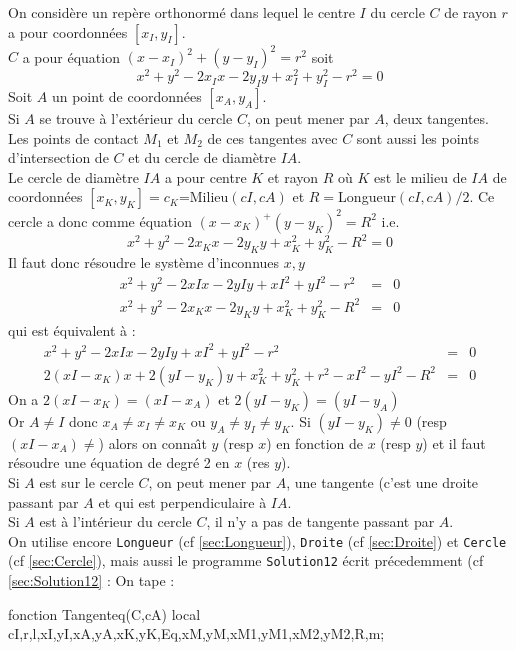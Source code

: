 \documentclass[12pt,a4paper]{book}
\begin{document}
\begin{giacjshere}
On consid\`ere un rep\`ere orthonorm\'e dans lequel le centre $I$ du cercle 
$C$ de rayon $r$ a pour  coordonn\'ees $[x_I,y_I]$.\\
$ C$ a pour \'equation $(x-x_I)^2+(y-y_I)^2=r^2$ soit
$$x^2+y^2-2x_Ix-2y_Iy+x_I^2+y_I^2-r^2=0$$
Soit $ A$ un point de coordonn\'ees $ [x_A,y_A]$.\\
Si $ A$ se trouve \`a l'ext\'erieur du cercle $ C$, on peut mener par 
$ A$, deux tangentes. Les points de contact $ M_1$ et $ M_2$ de ces 
tangentes  avec $ C$ sont aussi les points d'intersection de $ C$ et du 
cercle de diam\`etre $ IA$.\\ 
Le cercle de diam\`etre $ IA$ a pour centre $ K$ et rayon $R$
o\`u $K$ est le milieu de $ IA$
de coordonn\'ees $ [x_K,y_K]=c_K$=Milieu$(cI,cA)$ et
$ R=$Longueur$(cI,cA)/2$.
Ce cercle a donc comme \'equation $(x-x_K)^+(y-y_K)^2=R^2$ i.e.\\
$$x^2+y^2-2x_Kx-2y_Ky+x_K^2+y_K^2-R^2=0$$
Il faut donc r\'esoudre le syst\`eme d'inconnues $x,y$
\begin{eqnarray*}
x^2+y^2-2xIx-2yIy+xI^2+yI^2-r^2&=&0\\
x^2+y^2-2x_Kx-2y_Ky+x_K^2+y_K^2-R^2&=&0
\end{eqnarray*}
qui est \'equivalent \`a :
\begin{eqnarray*}
x^2+y^2-2xIx-2yIy+xI^2+yI^2-r^2&=&0 \\
2(xI-x_K)x+2(yI-y_K)y+x_K^2+y_K^2+r^2-xI^2-yI^2-R^2&=&0
\end{eqnarray*}
On a $2(xI-x_K)=(xI-x_A)$ et $2(yI-y_K)=(yI-y_A)$\\
Or $ A\neq I$ donc $x_A\neq x_I \neq x_K$ ou $y_A \neq y_I \neq y_K$.
Si $(yI-y_K) \neq 0$ (resp $(xI-x_A) \neq $) alors on conna\^{\i}t $y$ 
(resp $x$) en fonction 
de $x$ (resp $y$) et il faut r\'esoudre une \'equation 
de degr\'e 2 en $x$ (res $y$).\\
Si $ A$ est sur le cercle $ C$, on peut mener par 
$ A$, une tangente 
(c'est une droite passant par $ A$ et qui est perpendiculaire \`a $ IA$. \\
Si $ A$ est \`a l'int\'erieur du cercle $ C$, il n'y a  pas de 
tangente passant par $ A$.\\
On  utilise encore {\tt Longueur} (cf \ref{sec:Longueur}), {\tt Droite}
(cf \ref{sec:Droite}) et {\tt Cercle} (cf \ref{sec:Cercle}), mais aussi le 
programme  {\tt Solution12} \'ecrit pr\'ecedemment  (cf \ref{sec:Solution12} :
On tape :
\begin{giacprog}
fonction Tangenteq(C,cA)
 local cI,r,l,xI,yI,xA,yA,xK,yK,Eq,xM,yM,xM1,yM1,xM2,yM2,R,m;

\end{giacprog}
\end{giacjshere}
\end{document}
